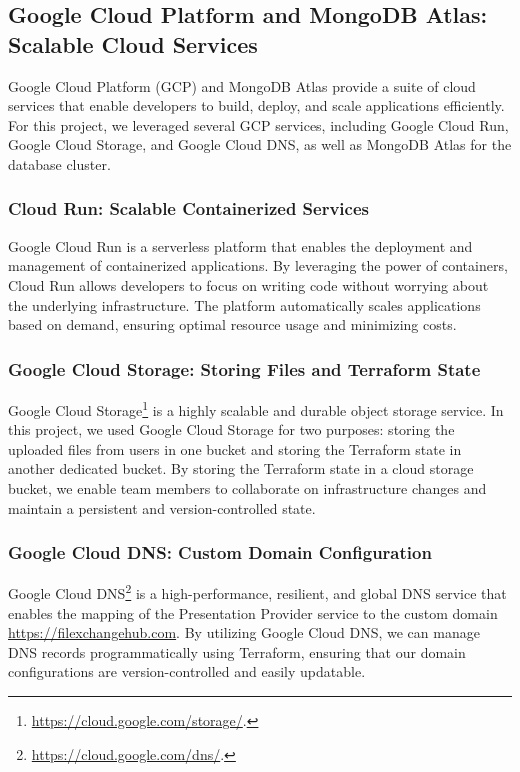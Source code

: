 \documentclass[a4paper,fleqn]{cas-dc}
\begin{document}
\subsection{Google Cloud Platform and MongoDB Atlas: Scalable Cloud Services}

Google Cloud Platform (GCP) and MongoDB Atlas provide a suite of cloud services that enable developers to build, deploy, and scale applications efficiently. For this project, we leveraged several GCP services, including Google Cloud Run, Google Cloud Storage, and Google Cloud DNS, as well as MongoDB Atlas for the database cluster.

\subsubsection{Cloud Run: Scalable Containerized Services}

Google Cloud Run \cite{Burkat2021} is a serverless platform that enables the deployment and management of containerized applications. By leveraging the power of containers, Cloud Run allows developers to focus on writing code without worrying about the underlying infrastructure. The platform automatically scales applications based on demand, ensuring optimal resource usage and minimizing costs.

\subsubsection{Google Cloud Storage: Storing Files and Terraform State}

Google Cloud Storage\footnote{ \url{https://cloud.google.com/storage/}.} is a highly scalable and durable object storage service. In this project, we used Google Cloud Storage for two purposes: storing the uploaded files from users in one bucket and storing the Terraform state in another dedicated bucket. By storing the Terraform state in a cloud storage bucket, we enable team members to collaborate on infrastructure changes and maintain a persistent and version-controlled state.

\subsubsection{Google Cloud DNS: Custom Domain Configuration}

Google Cloud DNS\footnote{ \url{https://cloud.google.com/dns/}.} is a high-performance, resilient, and global DNS service that enables the mapping of the Presentation Provider service to the custom domain \url{https://filexchangehub.com}. By utilizing Google Cloud DNS, we can manage DNS records programmatically using Terraform, ensuring that our domain configurations are version-controlled and easily updatable.
\end{document}
